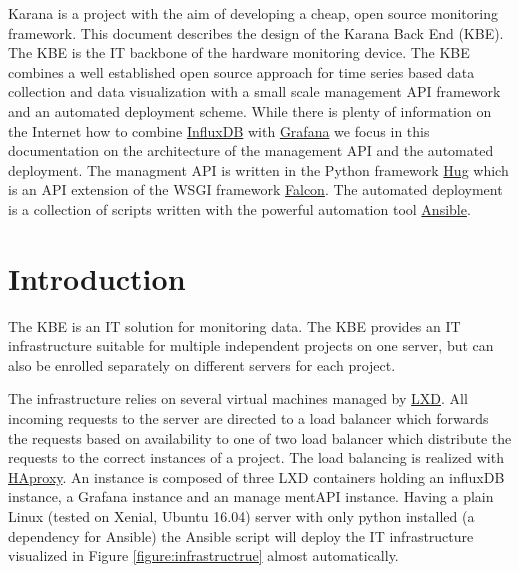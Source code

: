 \documentclass[
10pt, %
a4paper, %
oneside, %
headinclude,footinclude, %
BCOR5mm, %
]{scrartcl}
\begin{document}
Karana is a project with the aim of developing a cheap, open source monitoring framework. This document describes the design of the Karana Back End (KBE). The KBE is the IT backbone of the hardware monitoring device. The KBE combines a well established open source approach for time series based data collection and data visualization with a small scale management API framework and an automated deployment scheme. While there is plenty of information on the Internet how to combine \href{https://www.influxdata.com/}{InfluxDB} with \href{http://grafana.org/}{Grafana} we focus in this documentation on the architecture of the management API and the automated deployment. The managment API is written in the Python framework \href{http://www.hug.rest/}{Hug} which is an API extension of the WSGI framework \href{http://falconframework.org/}{Falcon}. The automated deployment is a collection of scripts written with the powerful automation tool \href{https://www.ansible.com}{Ansible}. 

{\let\thefootnote\relax{}}



\newpage %


\section{Introduction}

The KBE is an IT solution for monitoring data. The KBE provides an IT infrastructure suitable for multiple independent projects on one server, but can also be enrolled separately on different servers for each project. 

The infrastructure relies on several virtual machines managed by \href{https://linuxcontainers.org/lxd/}{LXD}. All incoming requests to the server are directed to a load balancer which forwards the requests based on availability to one of two load balancer which distribute the requests to the correct instances of a project. The load balancing is realized with \href{http://www.haproxy.org/}{HAproxy}. An instance is composed of three LXD containers holding an influxDB instance, a Grafana instance and an manage mentAPI instance. Having a plain Linux (tested on Xenial, Ubuntu 16.04) server with only python installed (a dependency for Ansible) the Ansible script will deploy the IT infrastructure visualized in Figure \ref{figure:infrastructrue} almost automatically. 
\end{document}
